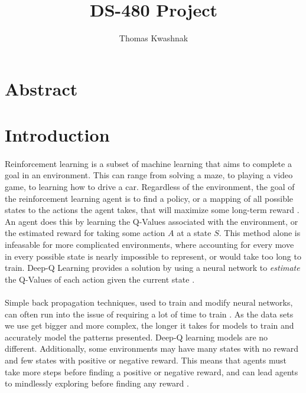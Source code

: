 \documentclass[12pt]{article}
\author{Thomas Kwashnak}
\title{DS-480 Project}
\begin{document}
\maketitle

\newpage

\section{Abstract}

\section{Introduction}



\paragraph{}
Reinforcement learning is a subset of machine learning that aims to complete a goal in an environment.
This can range from solving a maze, to playing a video game, to learning how to drive a car.
Regardless of the environment, the goal of the reinforcement learning agent is to find a policy, or a mapping of all possible states to the actions the agent takes, that will maximize some long-term reward \cite{article_reinforcement_learning_survey}.
An agent does this by learning the Q-Values associated with the environment, or the estimated reward for taking some action $A$ at a state $S$.
This method alone is infeasable for more complicated environments, where accounting for every move in every possible state is nearly impossible to represent, or would take too long to train.
Deep-Q Learning provides a solution by using a neural network to \textit{estimate} the Q-Values of each action given the current state \cite{article_human_level_control_deep_reinforcement_learning}.

\paragraph{}
Simple back propagation techniques, used to train and modify neural networks, can often run into the issue of requiring a lot of time to train \cite{article_accelerating_neural_networks_weight_extrapolations}.
As the data sets we use get bigger and more complex, the longer it takes for models to train and accurately model the patterns presented.
Deep-Q learning models are no different.
Additionally, some environments may have many states with no reward and few states with positive or negative reward.
This means that agents must take more steps before finding a positive or negative reward, and can lead agents to mindlessly exploring before finding any reward \cite{article_approx_optimal_approximate_reinforcement_learning}.
\end{document}
